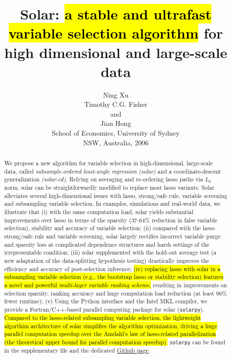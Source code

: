 \documentclass[12pt]{article}
\begin{document}

\title{\bf Solar: \hl{a stable and ultrafast variable selection algorithm} for high dimensional and large-scale data}
\author{Ning Xu \hspace{.4cm}\\
  Timothy C.G. Fisher \hspace{.4cm}\\
  and \hspace{.4cm}\\
  Jian Hong \hspace{.4cm}\\
  School of Economics, University of Sydney \hspace{.4cm}\\
  NSW, Australia, 2006}
\clearpage\maketitle

\begin{abstract}
  We propose a new algorithm for variable selection in high-dimensional, large-scale data, called \emph{subsample-ordered least-angle regression (solar)} and a coordinate-descent generalization \emph{(solar-cd)}. Relying on averaging and re-ordering lasso paths via $L_0$ norm, solar can be straightforwardly modified to replace most lasso variants. Solar alleviates several high-dimensional issues with lasso, strong/safe rule, variable screening and subsampling variable selection. In examples, simulations and real-world data, we illustrate that (i) with the same computation load, solar yields substantial improvements over lasso in terms of the sparsity (37-64\% reduction in false variable selection), stability and accuracy of variable selection; (ii) compared with the lasso strong/safe rule and variable screening, solar largely rectifies incorrect variable purge and sparsity loss at complicated dependence structures and harsh settings of the irrepresentable condition; (iii) solar supplemented with the hold-out average test (a new adaptation of the data-splitting hypothesis testing) drastically improves the efficiency and accuracy of post-selection inference; \hl{(iv) replacing lasso with solar in a subsampling variable selection (e.g., the bootstrap lasso or stability selection) features a novel and powerful \emph{multi-layer variable ranking scheme},} reuslting in improvements on selection sparsity, ranking accuracy and huge computation load reduction (at least 96\% fewer runtime); (v) Using the Python interface and the Intel MKL compiler, we provide a Fortran/C++-based parallel computing package for solar (\texttt{solarpy}). \hl{Compared to the lasso-related subsampling variable selection, the lightweight algorthim architecture of solar simplifies the algorithm optimization, driving a huge parallel computation speedup over the Amdahl's law of lasso-related parallelization (the theoretical upper bound for parallel computation speedup).} \texttt{solarpy} can be found in the supplementary file and the dedicated \href{https://github.com/isaac2math/solarpy}{Github page}.
\end{abstract}
\end{document}
